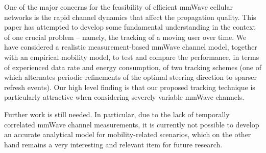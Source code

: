 \documentclass[conference]{IEEEtran}
\begin{document}
One of the major concerns for the feasibility of efficient mmWave cellular networks is the rapid channel dynamics that affect the propagation quality. 
This paper has attempted to develop some fundamental understanding in the context of one crucial problem -- namely, the tracking of a moving user over time. We have considered a realistic measurement-based mmWave channel model, together with an empirical mobility model, to test and compare the performance, in terms of experienced data rate and energy consumption, of two tracking schemes (one of which alternates periodic refinements of the optimal steering direction to sparser refresh events).
Our high level finding is that our proposed tracking technique is particularly attractive when considering severely variable mmWave channels.

Further work is still needed. In particular, due to the lack of temporally correlated mmWave
channel measurements, it is currently not possible to develop an accurate analytical model for
mobility-related scenarios, which on the other hand remains a very interesting and relevant item
for future research.




\end{document}
